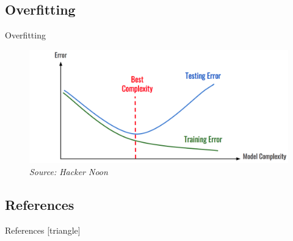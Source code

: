 \documentclass[xcolor=dvipsnames, fontsize=11pt, %
pagesize, %
parskip=half-, t]{beamer}
\begin{document}
\subsection{Overfitting}
\begin{frame}{Overfitting}
\begin{figure}[H]
\includegraphics[scale=0.33]{overfitting.png}
\caption{\textit{Source: Hacker Noon}}
\end{figure}
\end{frame}
\subsection{References}
\begin{frame}[c]{References}
[triangle]

\href{http://neuralnetworksanddeeplearning.com/chap1.html}{} \smallskip

\href{https://ljvmiranda921.github.io/notebook/2017/08/13/softmax-and-the-negative-log-likelihood/}{} \smallskip

\href{https://towardsdatascience.com/a-beginners-guide-to-neural-networks-part-two-bd503514c71a}{} \medskip

\href{https://www.deeplearningbook.org/}{} \medskip


\href{http://scs.ryerson.ca/~aharley/vis/fc/}{} \smallskip

\href{https://jed-ai.github.io/py1_gd_animation/}{} \medskip

\href{https://www.tensorflow.org/tutorials}{} \medskip


\end{frame}
\end{document}

